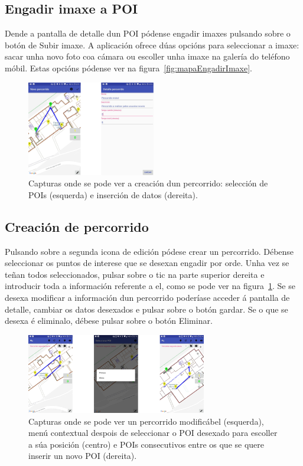 \subsection{Engadir imaxe a POI}
Dende a pantalla de detalle dun POI pódense engadir imaxes pulsando sobre o botón de Subir imaxe. A aplicación ofrece dúas opcións para seleccionar a imaxe: sacar unha novo foto coa cámara ou escoller unha imaxe na galería do teléfono móbil. Estas opcións pódense ver na figura~\ref{fig:mapaEngadirImaxe}.

\begin{figure}[h]
	\begin{center}
		\includegraphics[width=0.5\textwidth]{figures/android/mapaCrearPercorrido}
		\caption{Capturas onde se pode ver a creación dun percorrido: selección de POIs (esquerda) e inserción de datos (dereita).}
		\label{fig:mapaCrearPercorrido}
	\end{center}
\end{figure}

\subsection{Creación de percorrido}
Pulsando sobre a segunda icona de edición pódese crear un percorrido. Débense seleccionar os puntos de interese que se desexan engadir por orde. Unha vez se teñan todos seleccionados, pulsar sobre o tic na parte superior dereita e introducir toda a información referente a el, como se pode ver na figura~\ref{fig:mapaCrearPercorrido}. Se se desexa modificar a información dun percorrido poderíase acceder á pantalla de detalle, cambiar os datos desexados e pulsar sobre o botón gardar. Se o que se desexa é eliminalo, débese pulsar sobre o botón Eliminar.

\begin{figure}[h]
	\begin{center}
		\includegraphics[width=0.7\textwidth]{figures/android/mapaEngadirPoiPercorrido}
		\caption{Capturas onde se pode ver un percorrido modificábel (esquerda), menú contextual despois de seleccionar o POI desexado para escoller a súa posición (centro) e POIs consecutivos entre os que se quere inserir un novo POI (dereita).}
		\label{fig:mapaEngadirPoiPercorrido}
	\end{center}
\end{figure}

